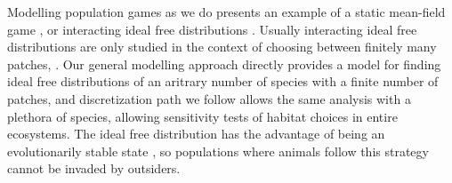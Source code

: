 



Modelling population games as we do presents an example of a static mean-field game \citep{lasry2007mean}, or interacting ideal free distributions \citep{cressman2004ideal}. Usually interacting ideal free distributions are only studied in the context of choosing between finitely many patches, \citep{kvrivan2008ideal}. Our general modelling approach directly provides a model for finding ideal free distributions of an aritrary number of species with a finite number of patches, and discretization path we follow allows the same analysis with a plethora of species, allowing sensitivity tests of habitat choices in entire ecosystems. The ideal free distribution has the advantage of being an evolutionarily stable state \citep{cressman2010ideal, krivan}, so populations where animals follow this strategy cannot be invaded by outsiders.




